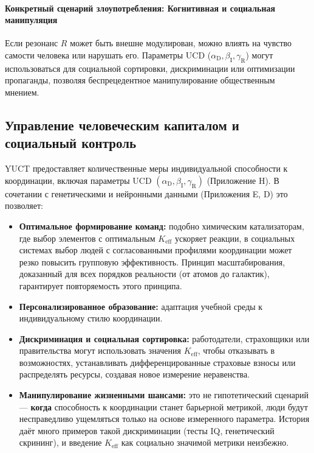 \documentclass[12pt,a4paper]{article}
\theoremstyle{remark}
\newcommand{\Keff}{K_{\mathrm{eff}}}
\newcommand{\alD}{\alpha_{\mathrm{D}}}
\newcommand{\beI}{\beta_{\mathrm{I}}}
\newcommand{\gaR}{\gamma_{\mathrm{R}}}
\begin{document}
	\paragraph{Конкретный сценарий злоупотребления: Когнитивная и социальная манипуляция}
	Если резонанс \(R\) может быть внешне модулирован, можно влиять на чувство самости человека или нарушать его. Параметры UCD (\(\alD,\beI,\gaR\)) могут использоваться для социальной сортировки, дискриминации или оптимизации пропаганды, позволяя беспрецедентное манипулирование общественным мнением.
	
	\subsection{Управление человеческим капиталом и социальный контроль}
	\label{subsec:human}
	
	YUCT предоставляет количественные меры индивидуальной способности к координации, включая параметры UCD \((\alD,\beI,\gaR)\) (Приложение H). В сочетании с генетическими и нейронными данными (Приложения E, D) это позволяет:
	\begin{itemize}[leftmargin=*]
		\item \textbf{Оптимальное формирование команд:} подобно химическим катализаторам, где выбор элементов с оптимальным \(\Keff\) ускоряет реакции, в социальных системах выбор людей с согласованными профилями координации может резко повысить групповую эффективность. Принцип масштабирования, доказанный для всех порядков реальности (от атомов до галактик), гарантирует повторяемость этого принципа.
		\item \textbf{Персонализированное образование:} адаптация учебной среды к индивидуальному стилю координации.
		\item \textbf{Дискриминация и социальная сортировка:} работодатели, страховщики или правительства могут использовать значения \(\Keff\), чтобы отказывать в возможностях, устанавливать дифференцированные страховые взносы или распределять ресурсы, создавая новое измерение неравенства.
		\item \textbf{Манипулирование жизненными шансами:} это не гипотетический сценарий — \textbf{когда} способность к координации станет барьерной метрикой, люди будут несправедливо ущемляться только на основе измеренного параметра. История даёт много примеров такой дискриминации (тесты IQ, генетический скрининг), и введение \(\Keff\) как социально значимой метрики неизбежно.
	\end{itemize}
	
\end{document}
